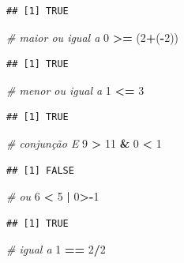 \documentclass[
]{book}
\newenvironment{Shaded}{\begin{snugshade}}{\end{snugshade}}
\newcommand{\CommentTok}[1]{\textcolor[rgb]{0.56,0.35,0.01}{\textit{#1}}}
\newcommand{\DecValTok}[1]{\textcolor[rgb]{0.00,0.00,0.81}{#1}}
\newcommand{\NormalTok}[1]{#1}
\newcommand{\SpecialCharTok}[1]{\textcolor[rgb]{0.81,0.36,0.00}{\textbf{#1}}}
\theoremstyle{definition}
\theoremstyle{definition}
\theoremstyle{definition}
\theoremstyle{definition}
\theoremstyle{remark}
\begin{document}
\begin{verbatim}
## [1] TRUE
\end{verbatim}

\begin{Shaded}
\begin{Highlighting}[]
\CommentTok{\# maior ou igual a}
\DecValTok{0} \SpecialCharTok{\textgreater{}=}\NormalTok{ (}\DecValTok{2}\SpecialCharTok{+}\NormalTok{(}\SpecialCharTok{{-}}\DecValTok{2}\NormalTok{))}
\end{Highlighting}
\end{Shaded}

\begin{verbatim}
## [1] TRUE
\end{verbatim}

\begin{Shaded}
\begin{Highlighting}[]
\CommentTok{\# menor ou igual a }
\DecValTok{1} \SpecialCharTok{\textless{}=} \DecValTok{3}
\end{Highlighting}
\end{Shaded}

\begin{verbatim}
## [1] TRUE
\end{verbatim}

\begin{Shaded}
\begin{Highlighting}[]
\CommentTok{\# conjunção E}
\DecValTok{9} \SpecialCharTok{\textgreater{}} \DecValTok{11} \SpecialCharTok{\&} \DecValTok{0} \SpecialCharTok{\textless{}} \DecValTok{1}
\end{Highlighting}
\end{Shaded}

\begin{verbatim}
## [1] FALSE
\end{verbatim}

\begin{Shaded}
\begin{Highlighting}[]
\CommentTok{\# ou}
\DecValTok{6} \SpecialCharTok{\textless{}} \DecValTok{5} \SpecialCharTok{|} \DecValTok{0}\SpecialCharTok{\textgreater{}{-}}\DecValTok{1}
\end{Highlighting}
\end{Shaded}

\begin{verbatim}
## [1] TRUE
\end{verbatim}

\begin{Shaded}
\begin{Highlighting}[]
\CommentTok{\# igual a}
\DecValTok{1} \SpecialCharTok{==} \DecValTok{2}\SpecialCharTok{/}\DecValTok{2}
\end{Highlighting}
\end{Shaded}
\end{document}
